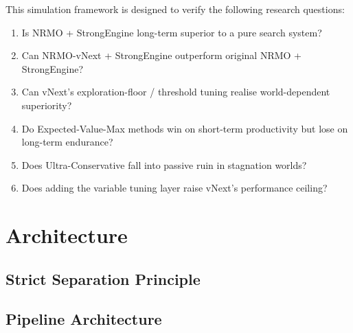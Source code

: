 
This simulation framework is designed to verify the following
research questions:

\begin{enumerate}
\item Is NRMO + StrongEngine long-term superior to a pure search
system?
\item Can NRMO-vNext + StrongEngine outperform original NRMO +
StrongEngine?
\item Can vNext's exploration-floor / threshold tuning realise
world-dependent superiority?
\item Do Expected-Value-Max methods win on short-term productivity
but lose on long-term endurance?
\item Does Ultra-Conservative fall into passive ruin in stagnation
worlds?
\item Does adding the variable tuning layer raise vNext's
performance ceiling?
\end{enumerate}

\section{Architecture}
\label{sec:vnext-architecture}

\subsection{Strict Separation Principle}
\label{sec:vnext-separation}


\subsection{Pipeline Architecture}
\label{sec:vnext-pipeline}

